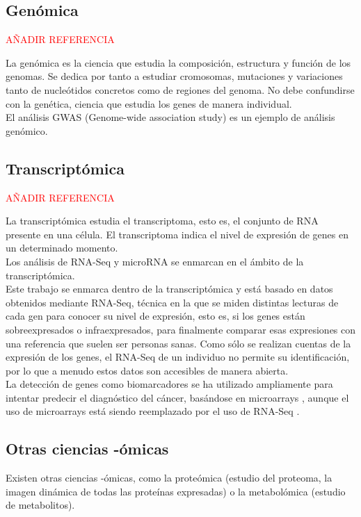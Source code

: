 \subsection{Genómica}

\textcolor{red}{AÑADIR REFERENCIA}

La genómica es la ciencia que estudia la composición, estructura y función de los genomas. Se dedica por tanto a estudiar cromosomas, mutaciones y variaciones tanto de nucleótidos concretos como de regiones del genoma. No debe confundirse con la genética, ciencia que estudia los genes de manera individual.\\

El análisis GWAS (Genome-wide association study) es un ejemplo de análisis genómico.

\subsection{Transcriptómica}

\textcolor{red}{AÑADIR REFERENCIA}

La transcriptómica estudia el transcriptoma, esto es, el conjunto de RNA presente en una célula. El transcriptoma indica el nivel de expresión de genes en un determinado momento.\\

Los análisis de RNA-Seq y microRNA se enmarcan en el ámbito de la transcriptómica.\\

Este trabajo se enmarca dentro de la transcriptómica y está basado en datos obtenidos mediante RNA-Seq, técnica en la que se miden distintas lecturas de cada gen para conocer su nivel de expresión, esto es, si los genes están sobreexpresados o infraexpresados, para finalmente comparar esas expresiones con una referencia que suelen ser personas sanas. Como sólo se realizan cuentas de la expresión de los genes, el RNA-Seq de un individuo no permite su identificación, por lo que a menudo estos datos son accesibles de manera abierta.\\

La detección de genes como biomarcadores se ha utilizado ampliamente para intentar predecir el diagnóstico del cáncer, basándose en microarrays \cite{Lee2008, Maglietta2007}, aunque el uso de microarrays está siendo reemplazado por el uso de RNA-Seq  \cite{Stark2019, VanVerk2013}.\\

\subsection{Otras ciencias -ómicas}

Existen otras ciencias -ómicas, como la proteómica (estudio del proteoma, la imagen dinámica de todas las proteínas expresadas) o la metabolómica (estudio de metabolitos).\\
